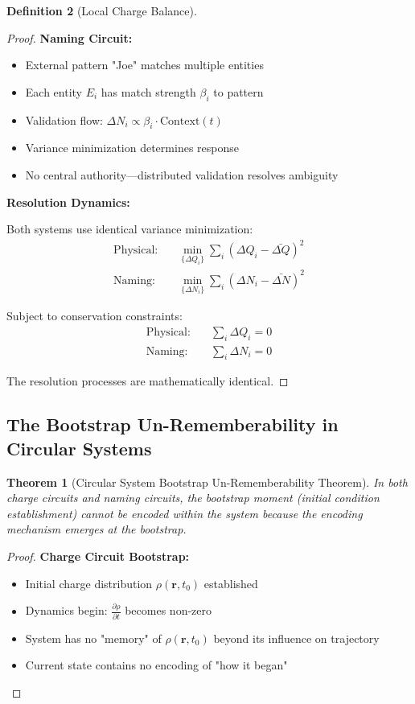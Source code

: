 \documentclass[12pt,a4paper]{article}
\theoremstyle{plain}
\newtheorem{theorem}{Theorem}[section]
\theoremstyle{definition}
\newtheorem{definition}[theorem]{Definition}
\theoremstyle{remark}
\begin{document}
\begin{definition}[Local Charge Balance]
\begin{proof}
\textbf{Naming Circuit:}
\begin{itemize}
\item External pattern "Joe" matches multiple entities
\item Each entity $E_i$ has match strength $\beta_i$ to pattern
\item Validation flow: $\Delta N_i \propto \beta_i \cdot \text{Context}(t)$
\item Variance minimization determines response
\item No central authority—distributed validation resolves ambiguity
\end{itemize}

\textbf{Resolution Dynamics:}

Both systems use identical variance minimization:
\begin{align}
\text{Physical:} &\quad \min_{\{\Delta Q_i\}} \sum_i (\Delta Q_i - \bar{\Delta Q})^2 \\
\text{Naming:} &\quad \min_{\{\Delta N_i\}} \sum_i (\Delta N_i - \bar{\Delta N})^2
\end{align}

Subject to conservation constraints:
\begin{align}
\text{Physical:} &\quad \sum_i \Delta Q_i = 0 \\
\text{Naming:} &\quad \sum_i \Delta N_i = 0
\end{align}

The resolution processes are mathematically identical.
\end{proof}

\subsection{The Bootstrap Un-Rememberability in Circular Systems}

\begin{theorem}[Circular System Bootstrap Un-Rememberability Theorem]
In both charge circuits and naming circuits, the bootstrap moment (initial condition establishment) cannot be encoded within the system because the encoding mechanism emerges at the bootstrap.
\end{theorem}

\begin{proof}
\textbf{Charge Circuit Bootstrap:}
\begin{itemize}
\item Initial charge distribution $\rho(\mathbf{r}, t_0)$ established
\item Dynamics begin: $\frac{\partial \rho}{\partial t}$ becomes non-zero
\item System has no "memory" of $\rho(\mathbf{r}, t_0)$ beyond its influence on trajectory
\item Current state contains no encoding of "how it began"
\end{itemize}


\end{proof}
\end{definition}
\end{document}
